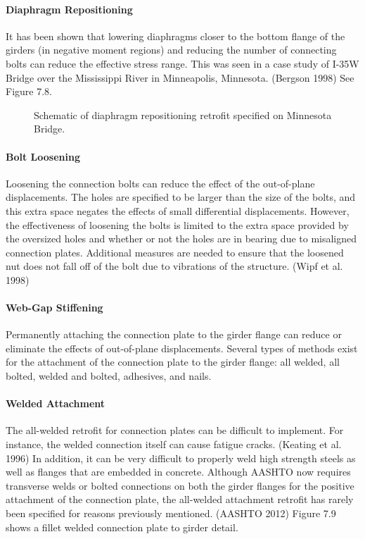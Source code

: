 \paragraph{Diaphragm Repositioning}
It has been shown that lowering diaphragms closer to the bottom flange of the girders (in negative moment
regions) and reducing the number of connecting bolts can reduce the effective stress range. This was seen in a case
study of I-35W Bridge over the Mississippi River in Minneapolis, Minnesota. (Bergson 1998) See Figure 7.8.

\begin{figure}
  \caption{Schematic of diaphragm repositioning retrofit specified on Minnesota Bridge.}
  \label{fig:diaphragm-reposition-retrofit}
\end{figure}

\paragraph{Bolt Loosening}
Loosening the connection bolts can reduce the effect of the out-of-plane displacements. The holes are specified
to be larger than the size of the bolts, and this extra space negates the effects of small differential displacements.
However, the effectiveness of loosening the bolts is limited to the extra space provided by the oversized holes and
whether or not the holes are in bearing due to misaligned connection plates. Additional measures are needed to
ensure that the loosened nut does not fall off of the bolt due to vibrations of the structure. (Wipf et al. 1998)

\paragraph{Web-Gap Stiffening}
Permanently attaching the connection plate to the girder flange can reduce or eliminate the effects of out-of-plane
displacements. Several types of methods exist for the attachment of the connection plate to the girder flange: all
welded, all bolted, welded and bolted, adhesives, and nails.

\paragraph{Welded Attachment}
The all-welded retrofit for connection plates can be difficult to implement. For instance, the welded connection
itself can cause fatigue cracks. (Keating et al. 1996) In addition, it can be very difficult to properly weld high
strength steels as well as flanges that are embedded in concrete. Although AASHTO now requires transverse welds
or bolted connections on both the girder flanges for the positive attachment of the connection plate, the all-welded
attachment retrofit has rarely been specified for reasons previously mentioned. (AASHTO 2012) Figure 7.9 shows a
fillet welded connection plate to girder detail.

